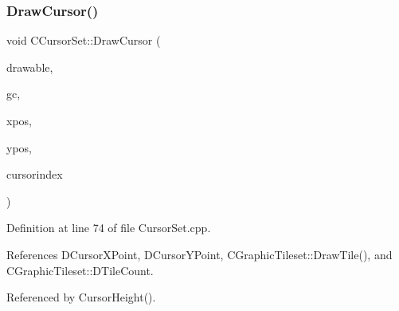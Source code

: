 \subsubsection{\texorpdfstring{Draw\+Cursor()}{DrawCursor()}}
{\footnotesize\ttfamily void C\+Cursor\+Set\+::\+Draw\+Cursor (\begin{DoxyParamCaption}\item[{Gdk\+Drawable $\ast$}]{drawable,  }\item[{Gdk\+GC $\ast$}]{gc,  }\item[{gint}]{xpos,  }\item[{gint}]{ypos,  }\item[{int}]{cursorindex }\end{DoxyParamCaption})}



Definition at line 74 of file Cursor\+Set.\+cpp.



References D\+Cursor\+X\+Point, D\+Cursor\+Y\+Point, C\+Graphic\+Tileset\+::\+Draw\+Tile(), and C\+Graphic\+Tileset\+::\+D\+Tile\+Count.



Referenced by Cursor\+Height().


